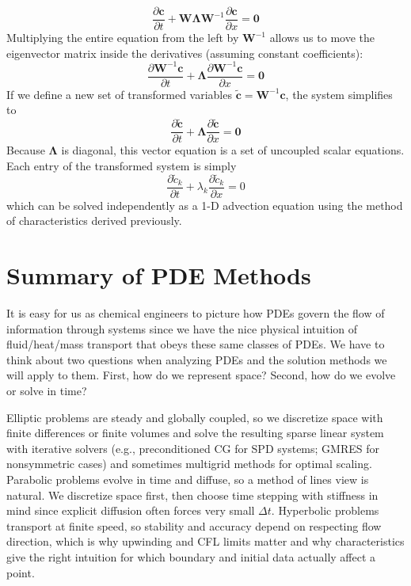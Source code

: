 \begin{equation}
    \frac{\partial \mathbf{c}}{\partial t} + \mathbf{W}\mathbf{\Lambda}\mathbf{W}^{-1} \frac{\partial \mathbf{c}}{\partial x} = \mathbf{0}
\end{equation}
Multiplying the entire equation from the left by $\mathbf{W}^{-1}$ allows us to move the eigenvector matrix inside the derivatives (assuming constant coefficients):
\begin{equation}
    \frac{\partial \mathbf{W}^{-1}\mathbf{c}}{\partial t} + \mathbf{\Lambda} \frac{\partial \mathbf{W}^{-1}\mathbf{c}}{\partial x} = \mathbf{0}
\end{equation}
If we define a new set of transformed variables $\widetilde{\mathbf{c}} = \mathbf{W}^{-1}\mathbf{c}$, the system simplifies to
\begin{equation}
    \frac{\partial \widetilde{\mathbf{c}}}{\partial t} + \mathbf{\Lambda} \frac{\partial \widetilde{\mathbf{c}}}{\partial x} = \mathbf{0}
\end{equation}
Because $\mathbf{\Lambda}$ is diagonal, this vector equation is a set of uncoupled scalar equations. Each entry of the transformed system is simply
\begin{equation}
    \frac{\partial \widetilde{c}_k}{\partial t} + \lambda_k \frac{\partial \widetilde{c}_k}{\partial x} = 0
\end{equation}
which can be solved independently as a 1-D advection equation using the method of characteristics derived previously.

\section{Summary of PDE Methods}
It is easy for us as chemical engineers to picture how PDEs govern the flow of information through systems since we have the nice physical intuition of fluid/heat/mass transport that obeys these same classes of PDEs. We have to think about two questions when analyzing PDEs and the solution methods we will apply to them. First, how do we represent space? Second, how do we evolve or solve in time? 

Elliptic problems are steady and globally coupled, so we discretize space with finite differences or finite volumes and solve the resulting sparse linear system with iterative solvers (e.g., preconditioned CG for SPD systems; GMRES for nonsymmetric cases) and sometimes multigrid methods for optimal scaling. Parabolic problems evolve in time and diffuse, so a method of lines view is natural. We discretize space first, then choose time stepping with stiffness in mind since explicit diffusion often forces very small $\Delta t$. Hyperbolic problems transport at finite speed, so stability and accuracy depend on respecting flow direction, which is why upwinding and CFL limits matter and why characteristics give the right intuition for which boundary and initial data actually affect a point.

